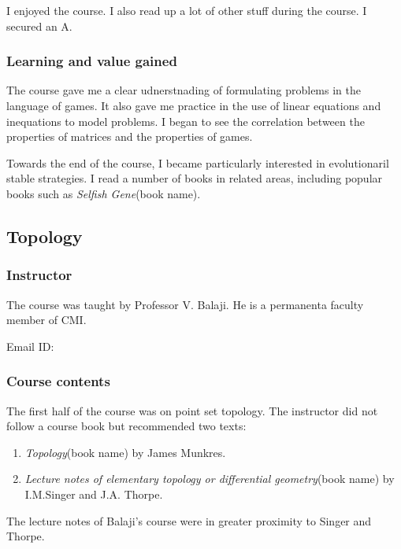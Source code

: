 \documentclass[a4paper]{amsart}
\newcommand{\bookname}[1]{{\em #1}{\small{(book name)}}}
\begin{document}
I enjoyed the course. I also read up a lot of other stuff during the course.
I secured an A.

\subsubsection{Learning and value gained}

The course gave me a clear udnerstnading of formulating problems in
the language of games. It also gave me practice in the use of linear
equations and inequations to model problems. I began to see the
correlation between the properties of matrices and the properties of
games.

Towards the end of the course, I became particularly interested in evolutionaril stable strategies. I read a number of books in related areas, including
popular books such as \bookname{Selfish Gene}.

\subsection{Topology}\label{topology}

\subsubsection{Instructor}

The course was taught by Professor V. Balaji. He is a permanenta faculty member of CMI.

Email ID: 

\subsubsection{Course contents}

The first half of the course was on point set topology. The instructor did not follow a course book
but recommended two texts:

\begin{enumerate}

\item \bookname{Topology} by James Munkres.

\item \bookname{Lecture notes of elementary topology or differential geometry} 
  by I.M.Singer and J.A. Thorpe.

\end{enumerate}

The lecture notes of Balaji's course were in greater proximity to
Singer and Thorpe.
\end{document}

